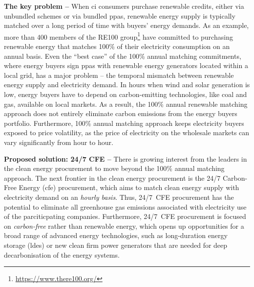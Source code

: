 \textbf{The key problem --} When \gls{ci} consumers purchase renewable credits, either via unbundled schemes or via bundled \gls{ppa}s, renewable energy supply is typically matched over a long period of time with buyers' energy demands.
As an example, more than 400 members of the RE100 group\footnote{\url{https://www.there100.org/}} have committed to purchasing renewable energy that matches 100\% of their electricity consumption on an annual basis.
Even the \enquote{best case} of the 100\% annual matching commitments, where energy buyers sign \gls{ppa}s with renewable energy generators located within a local grid, has a major problem -- the temporal mismatch between renewable energy supply and electricity demand.
In hours when wind and solar generation is low, energy buyers have to depend on carbon-emitting technologies, like coal and gas, available on local markets.
As a result, the 100\% annual renewable matching approach does not entirely eliminate carbon emissions from the energy buyers portfolio.
Furthermore, 100\% annual matching approach keeps electricity buyers exposed to price volatility, as the price of electricity on the wholesale markets can vary significantly from hour to hour.


\textbf{Proposed solution: 24/7 CFE --} There is growing interest from the leaders in the clean energy procurement to move beyond the 100\% annual matching approach.
The next frontier in the clean energy procurement is the 24/7 Carbon-Free Energy (\gls{cfe}) procurement, which aims to match clean energy supply with electricity demand on an \textit{hourly basis}.
Thus, 24/7~CFE procurement has the potential to eliminate all greenhouse gas emissions associated with electricity use of the parciticpating companies.
Furthermore, 24/7~CFE procurement is focused on \textit{carbon-free} rather than renewable energy, which opens up opportunities for a broad range of advanced energy technologies, such as long-duration energy storage (\gls{ldes}) or new clean firm power generators that are needed for deep decarbonisation of the energy systems.

